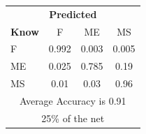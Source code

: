 \documentclass[12pt]{article} %
\begin{document}
\begin{minipage}{0.5\textwidth}
\begin{center}
\begin{tabular}{l|c|c|c|}
 \multicolumn{4}{c}{ \textbf{ Predicted}}\\
 \textbf{Know}&F&ME&MS\\ \hline\hline
F   &0.992&0.003&0.005\\
ME &0.025&0.785&0.19\\
MS &0.01&0.03&0.96\\
\multicolumn{4}{c}{Average Accuracy is 0.91}\\
\multicolumn{4}{c}{25\%  of the net}\\
\end{tabular}
\end{center}
\end{minipage}
\end{document}
